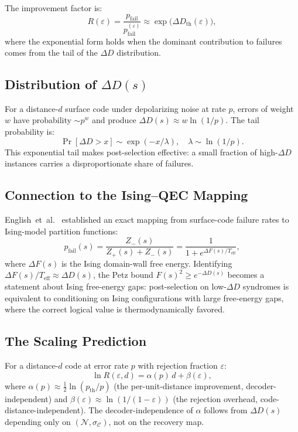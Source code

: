 \documentclass[prl,twocolumn,superscriptaddress,longbibliography]{revtex4-2}
\newcommand{\chan}{\mathcal{N}}
\newcommand{\code}{\mathcal{C}}
\begin{document}
The improvement factor is:
\begin{equation}
R(\varepsilon) = \frac{p_{\mathrm{fail}}}{p_{\mathrm{fail}}^{(\varepsilon)}}
\approx \exp\!\big(\Delta D_{\mathrm{th}}(\varepsilon)\big),
\end{equation}
where the exponential form holds when the dominant contribution to
failures comes from the tail of the $\Delta D$ distribution.

\subsection{Distribution of $\Delta D(s)$}

For a distance-$d$ surface code under depolarizing noise at rate $p$,
errors of weight $w$ have probability $\sim p^w$ and produce
$\Delta D(s) \approx w \ln(1/p)$. The tail probability is:
\begin{equation}
\Pr[\Delta D > x] \sim \exp(-x/\lambda),
\quad \lambda \sim \ln(1/p).
\end{equation}
This exponential tail makes post-selection effective: a small fraction
of high-$\Delta D$ instances carries a disproportionate share of
failures.

\subsection{Connection to the Ising--QEC Mapping}

English~et~al.~\cite{EnglishEtAl2025} established an exact mapping
from surface-code failure rates to Ising-model partition functions:
\begin{equation}
p_{\mathrm{fail}}(s) = \frac{Z_{-}(s)}{Z_{+}(s) + Z_{-}(s)}
= \frac{1}{1 + e^{\Delta F(s)/T_{\mathrm{eff}}}},
\end{equation}
where $\Delta F(s)$ is the Ising domain-wall free energy. Identifying
$\Delta F(s)/T_{\mathrm{eff}} \approx \Delta D(s)$, the Petz bound
$F(s)^2 \geq e^{-\Delta D(s)}$ becomes a statement about Ising
free-energy gaps: post-selection on low-$\Delta D$ syndromes is
equivalent to conditioning on Ising configurations with large
free-energy gaps, where the correct logical value is
thermodynamically favored.

\subsection{The Scaling Prediction}

For a distance-$d$ code at error rate $p$ with rejection fraction
$\varepsilon$:
\begin{equation}
\ln R(\varepsilon, d) = \alpha(p)\, d + \beta(\varepsilon),
\end{equation}
where $\alpha(p) \approx \tfrac{1}{2}\ln(p_{\mathrm{th}}/p)$ (the
per-unit-distance improvement, decoder-independent) and
$\beta(\varepsilon) \approx \ln(1/(1-\varepsilon))$ (the rejection
overhead, code-distance-independent). The decoder-independence of
$\alpha$ follows from $\Delta D(s)$ depending only on $(\chan,
\sigma_\code)$, not on the recovery map.
\end{document}
